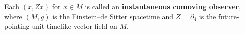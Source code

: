 Each $(x, Zx)$ for $x \in M$ is called an \textbf{instantaneous comoving observer}, where $(M, g)$ is the Einstein--de Sitter spacetime and $Z = \partial_4$ is the future-pointing unit timelike vector field on $M$.
